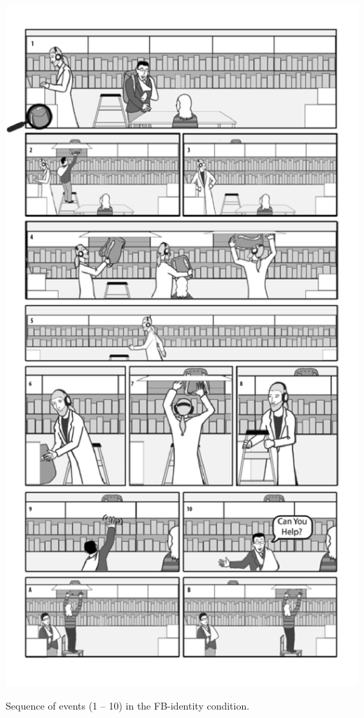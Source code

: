 \documentclass[12pt]{extarticle}
\begin{document}
\begin{multicols*}{3}
\begin{center}
\includegraphics[scale=0.37]{img/maymon_fig1.png}
\end{center}
Sequence of events (1 – 10) in the FB-identity condition.


\end{multicols*}
\end{document}
